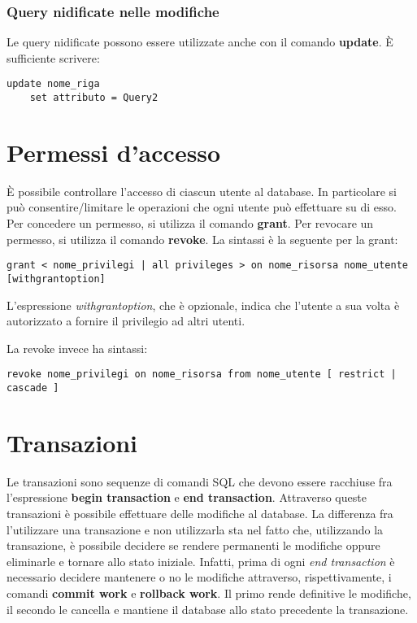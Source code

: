 \documentclass[\main/main.tex]{subfiles}
\begin{document}
\subsubsection{Query nidificate nelle modifiche}
Le query nidificate possono essere utilizzate anche con il comando \textbf{update}.
È sufficiente scrivere:
\begin{verbatim}
update nome_riga
    set attributo = Query2
\end{verbatim}

\section{Permessi d'accesso}
È possibile controllare l'accesso di ciascun utente al database. In particolare si può consentire/limitare le operazioni che ogni utente può effettuare su di esso.
Per concedere un permesso, si utilizza il comando \textbf{grant}. Per revocare un permesso, si utilizza il comando \textbf{revoke}.
La sintassi è la seguente per la grant:
\begin{verbatim}
grant < nome_privilegi | all privileges > on nome_risorsa nome_utente [withgrantoption]
  \end{verbatim}
L'espressione \textit{withgrantoption}, che è opzionale, indica che l'utente a sua volta è autorizzato a fornire il privilegio ad altri utenti.

La revoke invece ha sintassi:
\begin{verbatim}
revoke nome_privilegi on nome_risorsa from nome_utente [ restrict | cascade ]
\end{verbatim}

\section{Transazioni}
Le transazioni sono sequenze di comandi SQL che devono essere racchiuse fra l'espressione \textbf{begin transaction} e \textbf{end transaction}. Attraverso queste transazioni è possibile effettuare delle modifiche al database.
La differenza fra l'utilizzare una transazione e non utilizzarla sta nel fatto che, utilizzando la transazione, è possibile decidere se rendere permanenti le modifiche oppure eliminarle e tornare allo stato iniziale.
Infatti, prima di ogni \textit{end transaction} è necessario decidere mantenere o no le modifiche attraverso, rispettivamente, i comandi \textbf{commit work} e \textbf{rollback work}. Il primo rende definitive le modifiche, il secondo le cancella e mantiene il database allo stato precedente la transazione.
\end{document}
